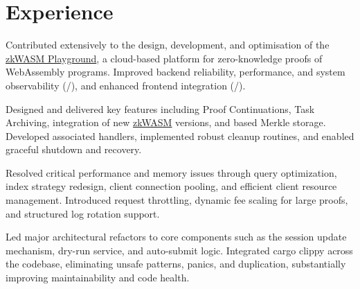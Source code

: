 \documentclass[a4paper]{resume}
\begin{document}
\hfill
%
%
\begin{minipage}[t]{0.66\textwidth} %
	\section{Experience}
	\smallsectionspace{}

	\vspace{\topsep}
	\begin{tightitemize}
		\item {
		            Contributed extensively to the design, development, and optimisation of the
		            \href{https://explorer.zkwasmhub.com}{zkWASM Playground}, a cloud-based platform for zero-knowledge proofs
		            of WebAssembly programs. Improved backend reliability, performance, and system observability
		            (\rust{}/\actix{}), and enhanced frontend integration (\react{}/\typescript{}).
		      }
		\item {
		            Designed and delivered key features including Proof Continuations, Task Archiving, integration of new
		            \href{https://github.com/DelphinusLab/zkWasm.git}{zkWASM} versions, and \rocksdb{} based Merkle storage.
		            Developed associated handlers, implemented robust cleanup routines, and enabled graceful shutdown and
		            recovery.
		      }
		\item {
		            Resolved critical \mongo{} performance and memory issues through query optimization, index strategy
		            redesign, client connection pooling, and efficient client resource management. Introduced request
		            throttling, dynamic fee scaling for large proofs, and structured log rotation support.
		      }
		\item {
		            Led major architectural refactors to core components such as the session update mechanism, dry-run
		            service, and auto-submit logic. Integrated cargo clippy across the codebase, eliminating unsafe patterns,
		            panics, and duplication, substantially improving maintainability and code health.
}
\end{tightitemize}
\end{minipage}
\end{document}
